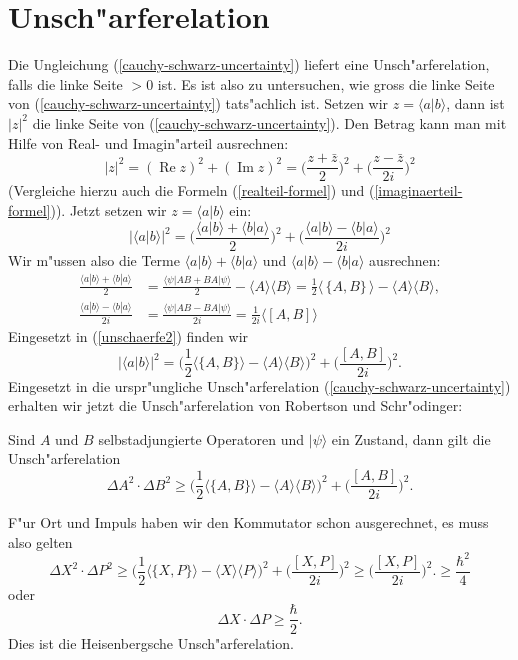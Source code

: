 \section{Unsch"arferelation}
Die Ungleichung (\ref{cauchy-schwarz-uncertainty}) liefert eine
Unsch"arferelation, falls die linke Seite $>0$ ist. Es ist
also zu untersuchen, wie gross die linke Seite von 
(\ref{cauchy-schwarz-uncertainty}) tats"achlich ist.
Setzen wir $z=\langle a|b\rangle$, dann ist $|z|^2$ die linke Seite
von (\ref{cauchy-schwarz-uncertainty}). Den Betrag kann man mit Hilfe
von Real- und Imagin"arteil ausrechnen:
\[
|z|^2
=
(\operatorname{Re}z)^2+(\operatorname{Im}z)^2
=
\biggl(\frac{z+\bar z}2\biggr)^2 + \biggl(\frac{z-\bar z}{2i}\biggr)^2
\]
(Vergleiche hierzu auch die Formeln (\ref{realteil-formel}) und 
(\ref{imaginaerteil-formel})).
Jetzt setzen wir $z=\langle a|b\rangle$ ein:
\begin{equation}
|\langle a|b\rangle|^2
=
\biggl(\frac{\langle a|b\rangle + \langle b|a\rangle}2\biggr)^2
+
\biggl(\frac{\langle a|b\rangle - \langle b|a\rangle}{2i}\biggr)^2
\label{unschaerfe2}
\end{equation}
Wir m"ussen also die Terme $\langle a|b\rangle + \langle b|a\rangle$
und $\langle a|b\rangle - \langle b|a\rangle$ ausrechnen:
\begin{align*}
\frac{\langle a|b\rangle + \langle b|a\rangle}2
&=
\frac{
\langle\psi|AB+BA|\psi\rangle 
}2
-\langle A\rangle\langle B\rangle
=
\frac12 \langle\,\{A,B\}\,\rangle - \langle A\rangle\langle B\rangle,
\\
\frac{\langle a|b\rangle - \langle b|a\rangle}{2i}
&=
\frac{\langle\psi|AB-BA|\psi\rangle}{2i}
=
\frac1{2i}\langle [A,B]\rangle
\end{align*}
Eingesetzt in (\ref{unschaerfe2}) finden wir
\[
|\langle a|b\rangle|^2
=
\biggl(
\frac12\langle \{A,B\}\rangle - \langle A\rangle\langle B\rangle
\biggr)^2
+
\biggl(
\frac{[A,B]}{2i}
\biggr)^2.
\]
Eingesetzt in die urspr"ungliche Unsch"arferelation
(\ref{cauchy-schwarz-uncertainty}) erhalten wir jetzt die Unsch"arferelation
von Robertson und Schr"odinger:

\begin{satz}
Sind $A$ und $B$ selbstadjungierte Operatoren und $|\psi\rangle$ ein
Zustand, dann gilt die Unsch"arferelation
\begin{equation}
\Delta A^2\cdot\Delta B^2\ge 
\biggl(
\frac12\langle \{A,B\}\rangle - \langle A\rangle\langle B\rangle
\biggr)^2
+
\biggl(
\frac{[A,B]}{2i}
\biggr)^2.
\label{uncertainty}
\end{equation}
\end{satz}

F"ur Ort und Impuls haben wir den Kommutator schon ausgerechnet, es
muss also gelten
\begin{equation}
\Delta X^2\cdot \Delta P^2
\ge
\biggl(
\frac12\langle \{X,P\}\rangle - \langle X\rangle\langle P\rangle
\biggr)^2
+
\biggl(
\frac{[X,P]}{2i}
\biggr)^2
\ge
\biggl(
\frac{[X,P]}{2i}
\biggr)^2.
\ge \frac{\hbar^2}4
\end{equation}
oder
\begin{equation}
\Delta X\cdot\Delta P\ge \frac{\hbar}2.
\end{equation}
Dies ist die Heisenbergsche Unsch"arferelation.
